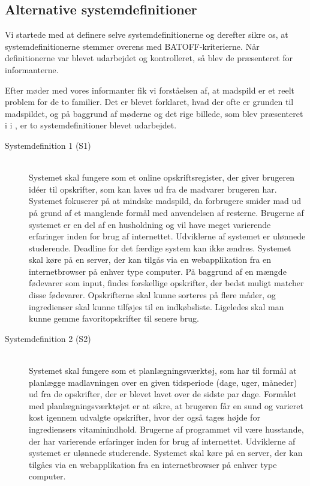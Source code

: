 \subsection{Alternative systemdefinitioner}
\label{subsec:alternativesystemdefinitioner}

Vi startede med at definere selve systemdefinitionerne og derefter sikre os, at systemdefinitionerne stemmer overens med BATOFF-kriterierne. Når definitionerne var blevet udarbejdet og kontrolleret, så blev de præsenteret for informanterne.

Efter møder med vores informanter fik vi forståelsen af, at madspild er et reelt problem for de to familier. Det er blevet forklaret, hvad der ofte er grunden til madspildet, og på baggrund af møderne og det rige billede, som blev præsenteret i  i , er to systemdefinitioner blevet udarbejdet.

\begin{description}
\item[Systemdefinition 1 (S1)] \hfill \\
Systemet skal fungere som et online opskriftsregister, der giver brugeren idéer til opskrifter, som kan laves ud fra de madvarer brugeren har. Systemet fokuserer på at mindske madspild, da forbrugere smider mad ud på grund af et manglende formål med anvendelsen af resterne. Brugerne af systemet er en del af en husholdning og vil have meget varierende erfaringer inden for brug af internettet. Udviklerne af systemet er ulønnede studerende. Deadline for det færdige system kan ikke ændres. Systemet skal køre på en server, der kan tilgås via en webapplikation fra en internetbrowser på enhver type computer. På baggrund af en mængde fødevarer som input, findes forskellige opskrifter, der bedst muligt matcher disse fødevarer. Opskrifterne skal kunne sorteres på flere måder, og ingredienser skal kunne tilføjes til en indkøbsliste. Ligeledes skal man kunne gemme favoritopskrifter til senere brug.
\item[Systemdefinition 2 (S2)] \hfill \\
Systemet skal fungere som et planlægningsværktøj, som har til formål at planlægge madlavningen over en given tidsperiode (\fx dage, uger, måneder) ud fra de opskrifter, der er blevet lavet over de sidste par dage. Formålet med planlægningsværktøjet er at sikre, at brugeren får en sund og varieret kost igennem udvalgte opskrifter, hvor der også tages højde for ingrediensers vitaminindhold. Brugerne af programmet vil være husstande, der har varierende erfaringer inden for brug af internettet. Udviklerne af systemet er ulønnede studerende. Systemet skal køre på en server, der kan tilgåes via en webapplikation fra en internetbrowser på enhver type computer.
\end{description}

